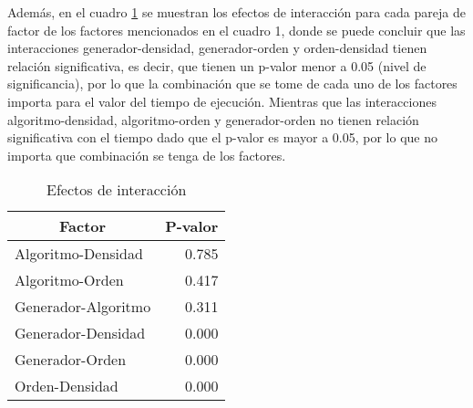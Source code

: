 \documentclass{article}
\begin{document}
Además, en el cuadro \ref{cuadro2} se muestran los efectos de interacción para cada pareja de factor de los factores mencionados en el cuadro 1, donde se puede concluir que las interacciones generador-densidad, generador-orden y orden-densidad tienen relación significativa, es decir, que tienen un p-valor menor a 0.05 (nivel de significancia), por lo que la combinación que se tome de cada uno de los factores importa para el valor del tiempo de ejecución. Mientras que las interacciones algoritmo-densidad, algoritmo-orden y generador-orden no tienen relación significativa con el tiempo dado que el p-valor es mayor a 0.05, por lo que no importa que combinación se tenga de los factores. 

\begin{table}[H]
\centering
\caption{Efectos de interacción}
\begin{tabular}{|l|r|}
\hline
\multicolumn{1}{|c|}{\textbf{Factor}} & \multicolumn{1}{c|}{\textbf{P-valor}} \\ \hline
Algoritmo-Densidad & 0.785 \\ \hline
Algoritmo-Orden & 0.417 \\ \hline
Generador-Algoritmo & 0.311 \\ \hline
Generador-Densidad & 0.000 \\ \hline
Generador-Orden & 0.000 \\ \hline
Orden-Densidad & 0.000 \\ \hline
\end{tabular}
\label{cuadro2}
\end{table}


\end{document}
